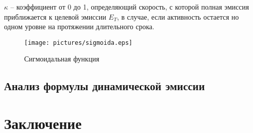 \documentclass[a4paper,12pt]{article}
\begin{document}
$\kappa$ -- коэффициент от 0 до 1, определяющий скорость, с которой полная эмиссия приближается к целевой эмиссии $E_T$, в случае, если активность остается но одном уровне на протяжении длительного срока.

\begin{figure}[h]
      \texttt{[image: pictures/sigmoida.eps]}
      \caption{Сигмоидальная функция}
      \label{fig:sigmoida}
\end{figure}

\subsection{Анализ формулы динамической эмиссии}






\section{Заключение}
\end{document}
